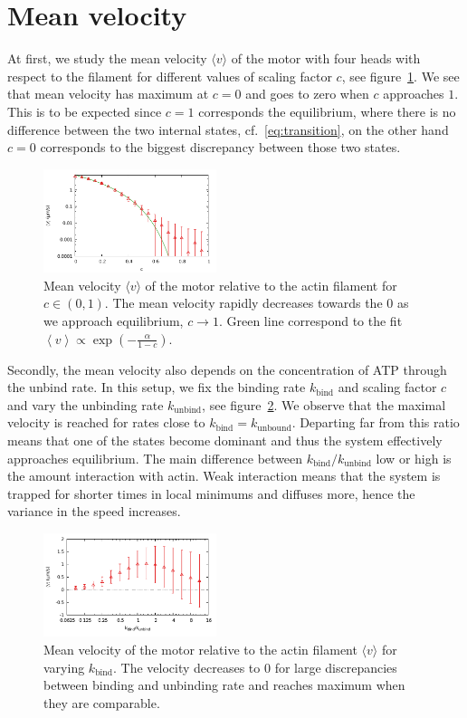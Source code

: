 \documentclass[aps,pre,twocolumn,showpacs,showkeys,superscriptaddress,floatfix]{revtex4-1}
\begin{document}
\section{Mean velocity}
\label{sec:velocity}
At first, we study the mean velocity $\langle v\rangle$ of the motor with four heads with respect to the filament for different values of scaling factor $c$, see figure~\ref{fig:c_v}.
We see that mean velocity has maximum at $c=0$ and goes to zero when $c$ approaches $1$. 
This is to be expected since $c=1$ corresponds the equilibrium, where there is no difference between the two internal states, cf.~\eqref{eq:transition},
on the other hand $c=0$ corresponds to the biggest discrepancy between those two states. 
\begin{figure}[t]
\centering
\includegraphics[width=0.45\textwidth,height=!]{c_v_4heads}
\caption{
\label{fig:c_v}
Mean velocity $\langle v \rangle$ of the motor relative to the actin filament for $c \in (0,1)$.
The mean velocity rapidly decreases towards the $0$ as we approach equilibrium, $c \to 1$.  
Green line correspond to the fit $ \left\langle v \right\rangle \propto \exp ( - \frac{\alpha}{1-c} ) $.
} 
\end{figure}


Secondly, the mean velocity also depends on the concentration of ATP through the unbind rate. 
In this setup, we fix the binding rate $k_\text{bind}$ and scaling factor $c$ and vary the unbinding rate $k_\text{unbind}$, see figure~\ref{fig:v_k}. 
We observe that the maximal velocity is reached for rates close to $k_\text{bind} = k_\text{unbound}$. 
Departing far from this ratio means that one of the states become dominant and thus the system effectively approaches equilibrium.  
The main difference between $k_\text{bind}/k_\text{unbind}$ low or high is the amount interaction with actin. 
Weak interaction means that the system is trapped for shorter times in local minimums and diffuses more, hence the variance in the speed increases. 
\begin{figure}[t]
\centering
\includegraphics[width=0.45\textwidth,height=!]{v_k}
\caption{
\label{fig:v_k} 
Mean velocity of the motor relative to the actin filament $\langle v \rangle$ for varying $k_\text{bind}$.
The velocity decreases to $0$ for large discrepancies between binding and unbinding rate and reaches maximum when they are comparable.
}
\end{figure}
\end{document}
